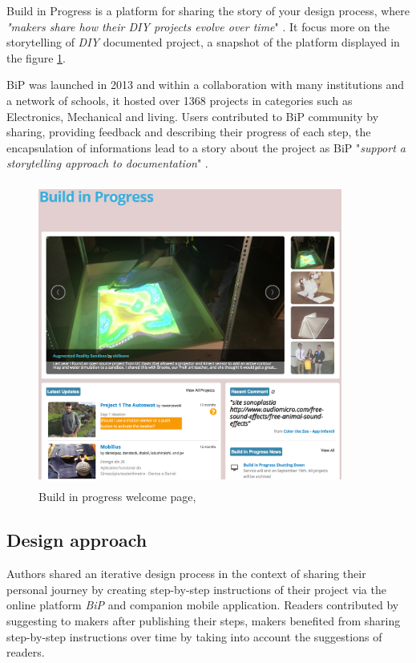 Build in Progress is a platform for sharing the story of your design process, where \textit{"makers share how their DIY projects evolve over time}" \cite{tseng2016making}. It focus more on the storytelling of \textit{DIY} documented project, a snapshot of the platform displayed in the figure \ref{img-buildinprogress}.

BiP was launched in 2013 and within a collaboration with many institutions and a network of schools, it hosted over 1368 projects in categories such as Electronics, Mechanical and living. Users contributed to BiP community by sharing, providing feedback and describing their progress of each step, the encapsulation of informations lead to a story about the project as BiP "\textit{support a storytelling approach to documentation}" \cite{tseng2016making}.
\begin{figure}[ht!]
	\centering
	\includegraphics[width=10cm, height=10cm]{./images/img-buildinprogress.png}
	\caption{Build in progress welcome page, \cite{BuildinP1}} 
	\label{img-buildinprogress}
\end{figure}

\vspace{-1cm}
\subsection{Design approach}
Authors shared an iterative design process in the context of sharing their personal journey by creating step-by-step instructions of their project via the online platform \textit{BiP} and companion mobile application. Readers contributed by suggesting to makers after publishing their steps, makers benefited from sharing step-by-step instructions over time by taking into account the suggestions of readers.

